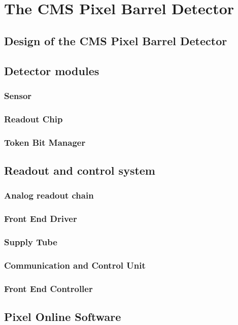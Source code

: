\chapter{The CMS Pixel Barrel Detector}
\label{ch:BPixIntro}

\section{Design of the CMS Pixel Barrel Detector}
\section{Detector modules}
\subsection{Sensor}
\subsection{Readout Chip}
\subsection{Token Bit Manager}

\section{Readout and control system}
\subsection{Analog readout chain}
\subsection{Front End Driver}
\subsection{Supply Tube}
\subsection{Communication and Control Unit}
\subsection{Front End Controller}

\section{Pixel Online Software}


